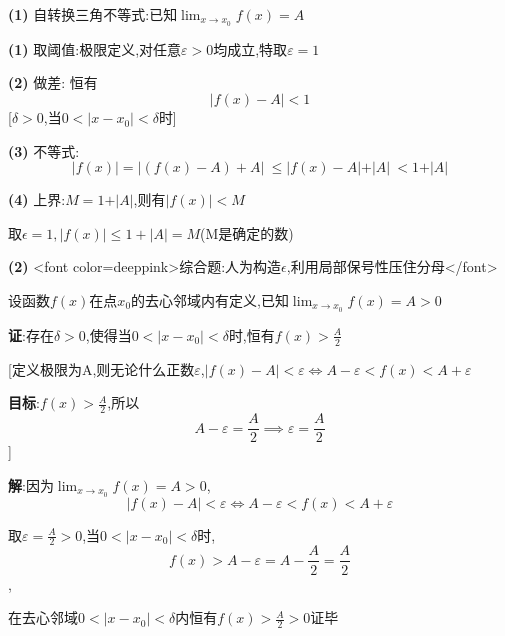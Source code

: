 \documentclass[11pt,a4paper,UTF8]{ctexart}
\begin{document}
\textbf{(1)} 自转换三角不等式:已知$\lim_{x \to x_0} f(x) = A$

\begin{solbox}[{分步推导与答题规范}]
\textbf{(1)} 取阈值:极限定义,对任意$\varepsilon > 0$均成立,特取$\varepsilon = 1$

\textbf{(2)} 做差:  恒有
\begin{equation*}
\vert{}f(x) - A\vert{} < 1
\end{equation*}
	[$\delta > 0$,当$0 < \vert{}x - x_0\vert{} < \delta$时]

\textbf{(3)} 不等式:
\begin{equation*}
\vert{}f(x)\vert{} = \vert{}(f(x) - A) + A\vert{} \ \le \vert{}f(x) - A\vert{} + \vert{}A\vert{} \ < 1 + \vert{}A\vert{}
\end{equation*}


\textbf{(4)} 上界:$M = 1 + \vert{}A\vert{}$,则有$\vert{}f(x)\vert{} < M$

取$\epsilon=1,|f(x)|\leq 1+|A| = M$(M是确定的数)
\end{solbox}

\textbf{(2)} \textit{}<font color=deeppink>综合题:人为构造$\epsilon$,利用局部保号性压住分母</font>\textit{}

\begin{solbox}[{分步推导与答题规范}]
  设函数$f(x)$在点$x_0$的去心邻域内有定义,已知$\lim_{x \to x_0} f(x) = A > 0$

  \textbf{证}:存在$\delta > 0$,使得当$0 < \vert{}x - x_0\vert{} < \delta$时,恒有$f(x) > \frac{A}{2}$

  [定义极限为A,则无论什么正数$\varepsilon$,$\vert{}f(x) - A\vert{} < \varepsilon \iff A - \varepsilon < f(x) < A + \varepsilon$

  \textbf{目标}:$f(x) > \frac{A}{2}$,所以
\begin{equation*}
A - \varepsilon = \frac{A}{2} \implies \varepsilon = \frac{A}{2}
\end{equation*}
]

  \textbf{解}:因为$\lim_{x \to x_0} f(x) = A > 0$,
\begin{equation*}
\vert{}f(x) - A\vert{} < \varepsilon \iff A - \varepsilon < f(x) < A + \varepsilon
\end{equation*}


  取$\varepsilon = \frac{A}{2} > 0$,当$0 < \vert{}x - x_0\vert{} < \delta$时,
\begin{equation*}
f(x) > A - \varepsilon = A - \frac{A}{2} = \frac{A}{2}
\end{equation*}
,

  在去心邻域$0 < \vert{}x - x_0\vert{} < \delta$内恒有$f(x) > \frac{A}{2} > 0$证毕
\end{solbox}
\end{document}
